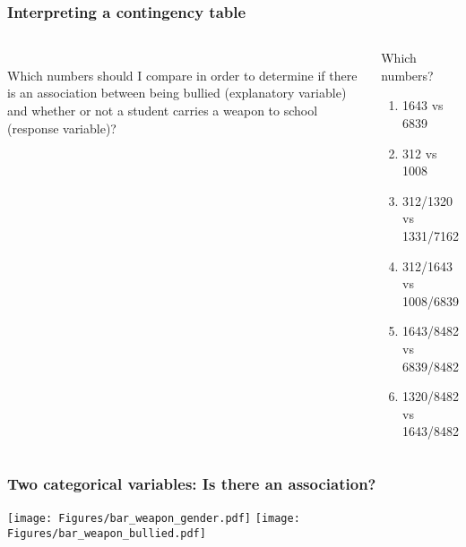 \begin{frame}
\frametitle{Interpreting a contingency table}
\begin{columns}
\\
\vskip10pt
Which numbers should I compare in order to determine if there is an association between being bullied (explanatory variable) and whether or not a student carries a weapon to school (response variable)?
\grp
\begin{clicker}{Which numbers?}
\begin{enumerate}
    \item
    1643 vs 6839
    \item
    312 vs 1008
    \item
    312/1320 vs 1331/7162
    \item
    312/1643 vs 1008/6839
    \item
    1643/8482 vs 6839/8482
    \item
    1320/8482 vs 1643/8482
\end{enumerate}
\end{clicker}
\end{columns}
\end{frame}

\begin{frame}
\frametitle{Two categorical variables: Is there an association?}
\begin{center}
\texttt{[image: Figures/bar\_weapon\_gender.pdf]}
\texttt{[image: Figures/bar\_weapon\_bullied.pdf]}
\end{center}
\end{frame}

